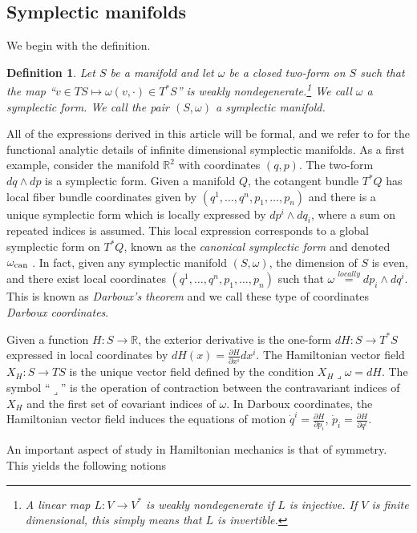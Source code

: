\documentclass[12pt]{amsart}
\newcommand{\pder}[2]{\ensuremath{\frac{\partial #1}{\partial #2}}}
\newcommand{\R}{\ensuremath{\mathbb{R}}}
\newtheorem{defn}[thm]{Definition}
\begin{document}
\subsection{Symplectic manifolds}
\label{sec:Symplectic}
We begin with the definition.
\begin{defn}
  Let $S$ be a manifold
  and let $\omega$ be a closed two-form on $S$ such that the map
  ``$v \in TS \mapsto \omega( v , \cdot ) \in T^*S$'' is weakly nondegenerate.\footnote{
    A linear map $L:V \to V^*$ is \emph{weakly nondegenerate} if $L$ is injective.  If $V$ is finite dimensional, this simply means that $L$ is invertible.}
  We call $\omega$ a \emph{symplectic form}.
  We call the pair $(S,\omega)$ a \emph{symplectic manifold}.
\end{defn}
All of the expressions derived in this article will be formal, and we refer to \cite{GayBalmazVizman2012}
for the functional analytic details of infinite dimensional symplectic manifolds.
As a first example, consider the manifold $\R^2$
with coordinates $(q,p)$.
The two-form $dq \wedge dp$ is a symplectic form.
Given a manifold $Q$,
the cotangent bundle $T^*Q$ has local fiber bundle coordinates
given by $(q^1,\dots, q^n,p_1,\dots,p_n)$ and there is a unique symplectic form
which is locally expressed by $dp^i \wedge dq_i$, where
a sum on repeated indices is assumed.
This local expression corresponds to a global symplectic
form on $T^*Q$, known as the \emph{canonical symplectic form}
and denoted $\omega_{\rm can}$ \cite[Theorem 3.2.10]{FOM}.
In fact, given any symplectic manifold $(S,\omega)$, the dimension of $S$
is even, and there exist local coordinates $(q^1,\dots,q^n,p_1,\dots,p_n)$
such that $\omega \stackrel{locally}{=} dp_i \wedge dq^i$.
This is known as \emph{Darboux's theorem} and we call these type of
coordinates \emph{Darboux coordinates}\cite[Theorem 3.2.2]{FOM}.

Given a function $H:S \to \mathbb{R}$,
the exterior derivative is the one-form $dH:S \to T^*S$
expressed in local coordinates by $dH(x) = \pder{H}{x^i} dx^i$.
The Hamiltonian vector field $X_H:S \to TS$ is the unique vector
field defined by the condition
$
  X_H \lrcorner \omega = dH.
$
The symbol ``$\lrcorner$'' is the operation of contraction between
the contravariant indices of $X_H$ and the first set of covariant
indices of $\omega$.
In Darboux coordinates, the Hamiltonian vector field induces the
equations of motion $\dot{q}^i = \pder{H}{p_i}$, $\dot{p}_i = \pder{H}{q^i}$.


An important aspect of study in Hamiltonian mechanics is that of symmetry.
This yields the following notions
\end{document}
